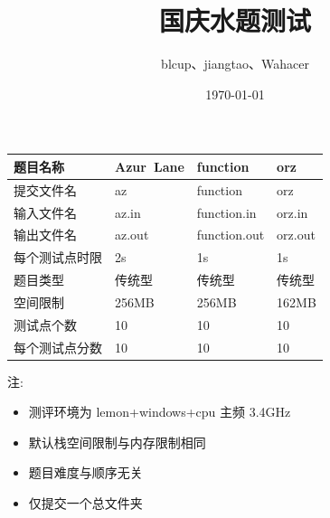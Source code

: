 \documentclass{article}
\begin{document}
\title{国庆水题测试}
\date{\today}
\author{blcup、jiangtao、Wahacer}
\maketitle
\begin{center}
\renewcommand{\arraystretch}{1.5}
\begin{table}[h]
\centering
\begin{tabular}{|p{3.2cm}<{\centering}|p{3.2cm}<{\centering}|p{3.2cm}<{\centering}|p{3.2cm}<{\centering}|}  
\hline
题目名称  & Azur\ Lane & function & orz \\  
\hline
提交文件名 & az & function & orz \\
\hline
输入文件名 & az.in & function.in &  orz.in\\
\hline
输出文件名 & az.out & function.out &  orz.out\\
\hline
每个测试点时限 & 2s & 1s & 1s \\
\hline
题目类型 & 传统型 & 传统型 & 传统型 \\
\hline
空间限制 & 256MB & 256MB & 162MB \\
\hline
测试点个数 & 10 & 10 & 10 \\
\hline
每个测试点分数 & 10 & 10 & 10 \\
\hline
\end{tabular}
\end{table}
\end{center}
注:
\begin{itemize}
  \item 测评环境为 lemon+windows+cpu 主频 3.4GHz
  \item 默认栈空间限制与内存限制相同
  \item 题目难度与顺序无关
  \item 仅提交一个总文件夹
\end{itemize}
\newpage
\end{document}
